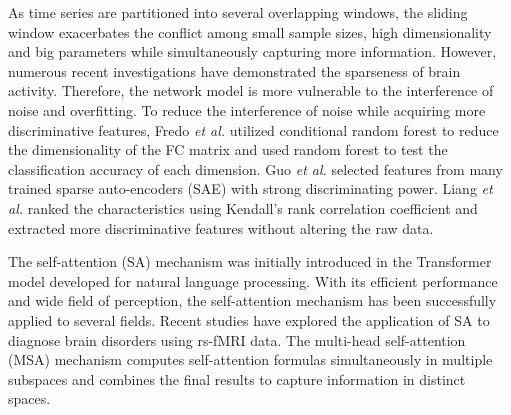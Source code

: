 \documentclass[journal,twoside,web]{ieeecolor}
\begin{document}

As time series are partitioned into several overlapping windows, the sliding window exacerbates the conflict among small sample sizes, high dimensionality and big parameters while simultaneously capturing more information. However, numerous recent investigations have demonstrated the sparseness of brain activity\cite{ju2017early}. Therefore, the network model is more vulnerable to the interference of noise and overfitting. To reduce the interference of noise while acquiring more discriminative features, Fredo \textit{et al.} utilized conditional random forest to reduce the dimensionality of the FC matrix and used random forest to test the classification accuracy of each dimension\cite{fredo2018diagnostic}. Guo \textit{et al.} selected features from many trained sparse auto-encoders (SAE) with strong discriminating power\cite{guo2017diagnosing}. Liang \textit{et al.} ranked the characteristics using Kendall's rank correlation coefficient and extracted more discriminative features without altering the raw data.\cite{liang2021convolutional}

The self-attention (SA) mechanism was initially introduced in the Transformer model developed for natural language processing\cite{vaswani2017attention}. With its efficient performance and wide field of perception, the self-attention mechanism has been successfully applied to several fields. Recent studies have explored the application of SA to diagnose brain disorders using rs-fMRI data\cite{kim2022interpretable, zhang2022self}. The multi-head self-attention (MSA) mechanism computes self-attention formulas simultaneously in multiple subspaces and combines the final results to capture information in distinct spaces.

\end{document}
